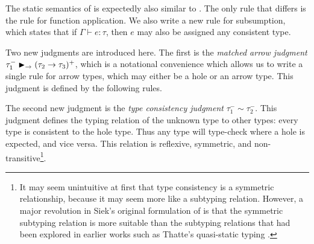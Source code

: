 The static semantics of \gtlc{} is expectedly also similar to \stlc. The only rule that differs is the rule for function application. We also write a new rule for subsumption, which states that if $\Gamma\vdash e:\tau$, then $e$ may also be assigned any consistent type.

\begin{singlespace}
\end{singlespace}

Two new judgments are introduced here. The first is the \textit{matched arrow judgment} $\tau_1^- \blacktriangleright_{\rightarrow} (\tau_2\to\tau_3)^+$, which is a notational convenience which allows us to write a single rule for arrow types, which may either be a hole or an arrow type. This judgment is defined by the following rules.

\begin{singlespace}
\end{singlespace}

The second new judgment is the \textit{type consistency judgment} $\tau_1^-\sim\tau_2^-$. This judgment defines the typing relation of the unknown type to other types: every type is consistent to the hole type. Thus any type will type-check where a hole is expected, and vice versa. This relation is reflexive, symmetric, and non-transitive\footnote{It may seem unintuitive at first that type consistency is a symmetric relationship, because it may seem more like a subtyping relation. However, a major revolution in Siek's original formulation of \gtlc is that the symmetric subtyping relation is more suitable than the subtyping relations that had been explored in earlier works such as Thatte's quasi-static typing \cite{Siek06gradualtyping}.}.

\begin{singlespace}
\end{singlespace}


